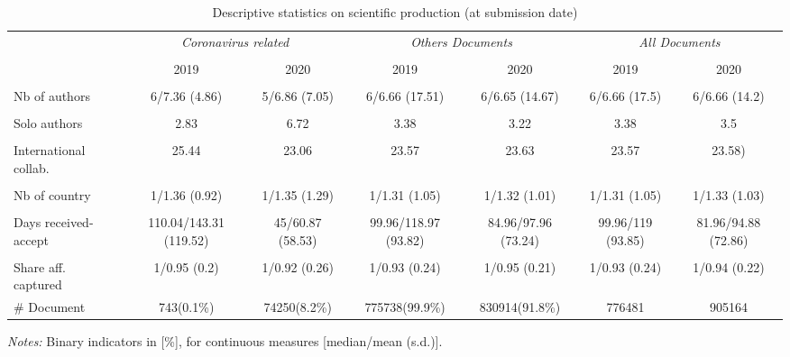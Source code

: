 \begin{landscape}

\begin{table}[t!]\footnotesize
\centering  
\caption{Descriptive statistics on scientific production (at submission date)}
\begin{threeparttable}
\label{tab:DescriptivesSciProd} 
\begin{tabular}{@{\extracolsep{-7pt}} lcccccc} 
\hline
& \multicolumn{2}{c}{\textit{Coronavirus related}} 
& \multicolumn{2}{c}{\textit{Others Documents}}
& \multicolumn{2}{c}{\textit{All Documents}} \\ 
\cline{2-7} 
\\[-1.8ex] & \multicolumn{1}{c}{2019}
&\multicolumn{1}{c}{2020}
&\multicolumn{1}{c}{2019}
& \multicolumn{1}{c}{2020}
&\multicolumn{1}{c}{2019}
&\multicolumn{1}{c}{2020} \\ 
  \hline
  \\[5pt]
  Nb of authors & 6/7.36 (4.86) & 5/6.86 (7.05) & 6/6.66 (17.51) & 6/6.65 (14.67) & 6/6.66 (17.5) & 6/6.66 (14.2) \\ 
  \\[5pt]
  Solo authors  & 2.83 & 6.72 & 3.38 & 3.22 & 3.38 & 3.5\\
    \\[5pt]
  International collab.  & 25.44 & 23.06 & 23.57 & 23.63 & 23.57 & 23.58) \\ 

\\[5pt]
  Nb of country & 1/1.36 (0.92) & 1/1.35 (1.29) & 1/1.31 (1.05) & 1/1.32 (1.01) & 1/1.31 (1.05) & 1/1.33 (1.03) \\ 
\\[5pt]
 Days received-accept & 110.04/143.31 (119.52) & 45/60.87 (58.53) & 99.96/118.97 (93.82) & 84.96/97.96 (73.24) & 99.96/119 (93.85) & 81.96/94.88 (72.86) \\ 
  \\[5pt]
 Share aff. captured & 1/0.95 (0.2) & 1/0.92 (0.26) & 1/0.93 (0.24) & 1/0.95 (0.21) & 1/0.93 (0.24) & 1/0.94 (0.22) \\ 

  \hline
   \# Document & 743(0.1\%) & 74250(8.2\%) & 775738(99.9\%) & 830914(91.8\%) & 776481 & 905164\\
  \hline
  \end{tabular}
  \begin{tablenotes}
  \footnotesize
  \item {\it Notes:} Binary indicators in [\%], for continuous measures [median/mean (s.d.)].
  \end{tablenotes}
 \end{threeparttable}
\end{table}

\end{landscape}




